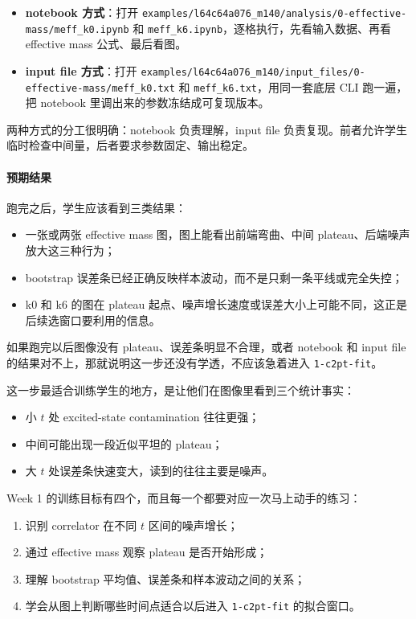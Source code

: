\documentclass[11pt,a4paper,fontset=fandol]{ctexart}
\begin{document}
\begin{itemize}[leftmargin=2em]
  \item \textbf{notebook 方式}：打开 \lstinline|examples/l64c64a076_m140/analysis/0-effective-mass/meff_k0.ipynb| 和 \lstinline|meff_k6.ipynb|，逐格执行，先看输入数据、再看 effective mass 公式、最后看图。
  \item \textbf{input file 方式}：打开 \lstinline|examples/l64c64a076_m140/input_files/0-effective-mass/meff_k0.txt| 和 \lstinline|meff_k6.txt|，用同一套底层 CLI 跑一遍，把 notebook 里调出来的参数冻结成可复现版本。
\end{itemize}

两种方式的分工很明确：notebook 负责理解，input file 负责复现。前者允许学生临时检查中间量，后者要求参数固定、输出稳定。

\paragraph{预期结果}

跑完之后，学生应该看到三类结果：

\begin{itemize}[leftmargin=2em]
  \item 一张或两张 effective mass 图，图上能看出前端弯曲、中间 plateau、后端噪声放大这三种行为；
  \item bootstrap 误差条已经正确反映样本波动，而不是只剩一条平线或完全失控；
  \item k0 和 k6 的图在 plateau 起点、噪声增长速度或误差大小上可能不同，这正是后续选窗口要利用的信息。
\end{itemize}

如果跑完以后图像没有 plateau、误差条明显不合理，或者 notebook 和 input file 的结果对不上，那就说明这一步还没有学透，不应该急着进入 \lstinline|1-c2pt-fit|。

这一步最适合训练学生的地方，是让他们在图像里看到三个统计事实：

\begin{itemize}[leftmargin=2em]
  \item 小 $t$ 处 excited-state contamination 往往更强；
  \item 中间可能出现一段近似平坦的 plateau；
  \item 大 $t$ 处误差条快速变大，读到的往往主要是噪声。
\end{itemize}

Week 1 的训练目标有四个，而且每一个都要对应一次马上动手的练习：

\begin{enumerate}[leftmargin=2em]
  \item 识别 correlator 在不同 $t$ 区间的噪声增长；
  \item 通过 effective mass 观察 plateau 是否开始形成；
  \item 理解 bootstrap 平均值、误差条和样本波动之间的关系；
  \item 学会从图上判断哪些时间点适合以后进入 \lstinline|1-c2pt-fit| 的拟合窗口。
\end{enumerate}
\end{document}
